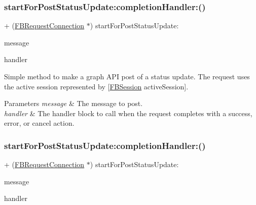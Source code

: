 \subsubsection{\texorpdfstring{start\+For\+Post\+Status\+Update\+:completion\+Handler\+:()}{startForPostStatusUpdate:completionHandler:()}\hspace{0.1cm}{\footnotesize\ttfamily [3/5]}}
{\footnotesize\ttfamily + (\hyperlink{interfaceFBRequestConnection}{F\+B\+Request\+Connection} $\ast$) start\+For\+Post\+Status\+Update\+: \begin{DoxyParamCaption}\item[{(N\+S\+String $\ast$)}]{message }\item[{completionHandler:(F\+B\+Request\+Handler)}]{handler }\end{DoxyParamCaption}}

Simple method to make a graph A\+PI post of a status update. The request uses the active session represented by {\ttfamily \mbox{[}\hyperlink{interfaceFBSession}{F\+B\+Session} active\+Session\mbox{]}}.


\begin{DoxyParams}{Parameters}
{\em message} & The message to post. \\
\hline
{\em handler} & The handler block to call when the request completes with a success, error, or cancel action. \\
\hline
\end{DoxyParams}
\mbox{\label{interfaceFBRequestConnection_a0dee12879e90db0c29e15916375c73b0}} 
\subsubsection{\texorpdfstring{start\+For\+Post\+Status\+Update\+:completion\+Handler\+:()}{startForPostStatusUpdate:completionHandler:()}\hspace{0.1cm}{\footnotesize\ttfamily [4/5]}}
{\footnotesize\ttfamily + (\hyperlink{interfaceFBRequestConnection}{F\+B\+Request\+Connection} $\ast$) start\+For\+Post\+Status\+Update\+: \begin{DoxyParamCaption}\item[{(N\+S\+String $\ast$)}]{message }\item[{completionHandler:(F\+B\+Request\+Handler)}]{handler }\end{DoxyParamCaption}}


